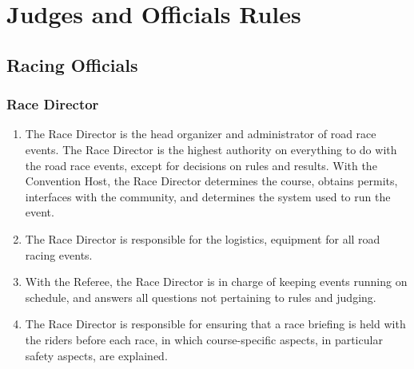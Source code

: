 \chapter{Judges and Officials Rules}

\section{Racing Officials}

\subsection{Race Director}
	\begin{enumerate}[leftmargin=1.5em,labelsep=*]
		\item The Race Director is the head organizer and administrator of road race events.
		The Race Director is the highest authority on everything to do with the road race events, except for decisions on rules and results.
		With the Convention Host, the Race Director determines the course, obtains permits, interfaces with the community, and determines the system used to run the event.
		\item The Race Director is responsible for the logistics, equipment for all road racing events.
		\item With the Referee, the Race Director is in charge of keeping events running on schedule, and answers all questions not pertaining to rules and judging.
		\item The Race Director is responsible for ensuring that a race briefing is held with the riders before each race, in which course-specific aspects, 
        in particular safety aspects, are explained.
	\end{enumerate}

